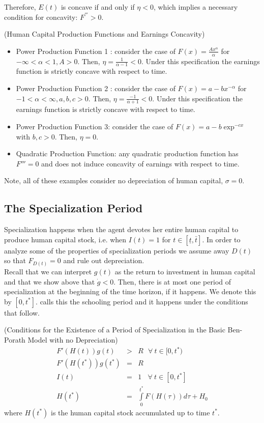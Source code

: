 \indent  Therefore, ${E(t)}$ is concave if and only if $\eta < 0$, which implies a necessary condition for concavity: $F^{'''}>0$.

\begin{example} (Human Capital Production Functions and Earnings Concavity)
\begin{itemize}
\item Power Production Function 1 : consider the case of $F(x) = \frac{Ax^{\alpha}}{\alpha}$ for $ - \infty < \alpha < 1, A > 0$. Then, $\eta = \frac{1}{\alpha - 1} < 0$. Under this specification the earnings function is strictly concave with respect to time.
\item Power Production Function 2 : consider the case of $F(x) = a - b x ^ {- \alpha}$ for $ - 1 < \alpha < \infty, a,b,c > 0$. Then, $\eta = \frac{-1}{\alpha + 1} < 0$. Under this specification the earnings function is strictly concave with respect to time.
\item Power Production Function 3: consider the case of $F(x) = a - b \exp^{-cx}$ with $b,c > 0$. Then, $\eta = 0$. 
\item Quadratic Production Function: any quadratic production function has $F''' = 0$ and does not induce concavity of earnings with respect to time. 
\end{itemize}
\noindent Note, all of these examples consider no depreciation of human capital, $\sigma = 0$. 
\end{example} 

\subsection{The Specialization Period} \label{section:specialization}
Specialization happens when the agent devotes her entire human capital to produce human capital stock, i.e. when $I(t) = 1$ for $t \in [ \underline{t}, \bar{t}]$. In order to analyze some of the properties of specialization periods we assume away $D(t)$ so that $F_{D(t)} = 0$ and rule out depreciation.\\
\indent Recall that we can interpret $g(t)$ as the return to investment in human capital and that we show above that $\dot{g} < 0$. Then, there is at most one period of specialization at the beginning of the time horizon, if it happens. We denote this by $[0,t^*]$. \citet{ben1967production} calls this the schooling period and it happens under the conditions that follow.

\begin{condition} (Conditions for the Existence of a Period of Specialization in the Basic Ben-Porath Model with no Depreciation)
\begin{eqnarray}
F'(H(t))g(t) &>& R\ \ \ \forall \ t\in [0,t^*) \nonumber \\
F'(H(t^*))g(t^*) &=& R\nonumber \\
I(t) &=& 1\ \ \ \ \forall \ t\in [0,t^*] \nonumber \\
H(t^*) &=& \int \limits _{0} ^{t^*} F (H(\tau)) d\tau + H_{0} \label{eq:humantstar}
\end{eqnarray} 
\noindent where $H(t^*)$ is the human capital stock accumulated up to time $t^*$.\\
\end{condition}

